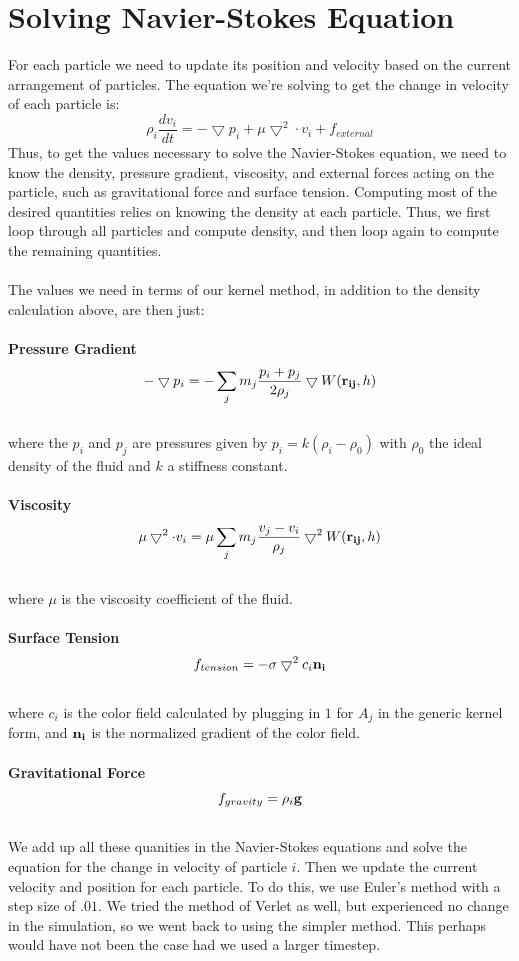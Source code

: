 \documentclass[11pt]{article}
\begin{document}
\section*{Solving Navier-Stokes Equation}
For each particle we need to update its position and velocity based on the current arrangement of particles. The equation we're solving to get the change in velocity of each particle is:
$$\rho_i \frac{dv_i}{dt} = - \bigtriangledown p_i + \mu \bigtriangledown^2 \cdot v_i + f_{external}$$
Thus, to get the values necessary to solve the Navier-Stokes equation, we need to know the density, pressure gradient, viscosity, and external forces acting on the particle, such as gravitational force and surface tension. Computing most of the desired quantities relies on knowing the density at each particle. Thus, we first loop through all particles and compute density, and then loop again to compute the remaining quantities.
\\
\\
The values we need in terms of our kernel method, in addition to the density calculation above, are then just:\\ \\
{\bf Pressure Gradient}
$$ - \bigtriangledown p_i = - \sum_{j}m_j \frac{p_i+p_j}{2\rho_j} \bigtriangledown W({\bf r_{ij}},h)$$
\\
where the $p_i$ and $p_j$ are pressures given by $p_i = k(\rho_i - \rho_0)$ with $\rho_0$ the ideal density of the fluid and $k$ a stiffness constant.
\\
\\
{\bf Viscosity}
$$ \mu \bigtriangledown^2 \cdot v_i = \mu  \sum_{j} m_j \frac{v_j-v_i}{\rho_j} \bigtriangledown^2 W({\bf r_{ij}},h) $$
\\
where $\mu$ is the viscosity coefficient of the fluid.
\\
\\
{\bf Surface Tension}
$$f_{tension} = -\sigma \bigtriangledown^2 c_i {\bf n_i}$$
\\
where $c_i$ is the color field calculated by plugging in $1$ for $A_j$ in the generic kernel form, and ${\bf n_i}$ is the normalized gradient of the color field.
\\
\\
{\bf Gravitational Force}
$$f_{gravity} = \rho_i {\bf g}$$
\\
We add up all these quanities in the Navier-Stokes equations and solve the equation for the change in velocity of particle $i$. Then we update the current velocity and position for each particle. To do this, we use Euler's method with a step size of $.01$.
We tried the method of Verlet as well, but experienced no change in the simulation, so we went back to using the simpler method. This perhaps would have not been the case had we used a larger timestep.
\end{document}
